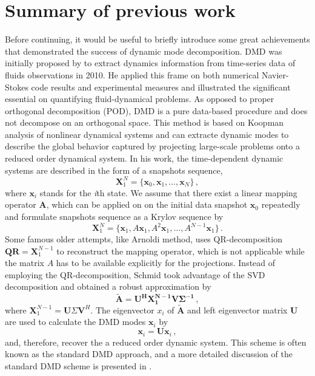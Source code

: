 \section{Summary of previous work}
Before continuing, it would be useful to briefly introduce some great achievements that demonstrated the success of dynamic mode decomposition.
DMD was initially proposed by \citet{schmid_dynamic_2010}\cite{schmid_applications_2011} to extract dynamics information from time-series data of fluids observations in 2010.
He applied this frame on both numerical Navier-Stokes code results and experimental measures and illustrated the significant essential on quantifying fluid-dynamical problems.
As opposed to proper orthogonal decomposition (POD)\cite{lumley2007stochastic}, DMD is a pure data-based procedure and does not decompose on an orthogonal space. 
This method is based on Koopman analysis of nonlinear dynamical systems and can extracte dynamic modes to describe the global behavior captured by projecting large-scale problems onto a reduced order dynamical system.
In his work, the time-dependent dynamic systems are described in the form of a snapshots sequence,
\begin{equation}
 \mathbf{X}^{N}_1 = \{\mathbf{x}_0, \mathbf{x}_1, \ldots, \mathbf{x}_{N} \} \, ,
 \label{eq:snap_matrix}
\end{equation}
where $\mathbf{x}_i$ stands for the {\it i}th state.
We assume that there exist a linear mapping operator $\mathbf{A}$, which can be applied on on the initial data snapshot $\mathbf{x}_0$ repeatedly and formulate snapshots sequence  as a Krylov sequence by
\begin{equation}
 \mathbf{X}^{N}_1 = \{\mathbf{x}_1,A\mathbf{x}_1,A^2\mathbf{x}_1,…,A^{N-1}\mathbf{x}_1 \} \, .
 \label{eq:Krylov_seq}
\end{equation}
Some famous older attempts, like Arnoldi method\cite{arnoldi1951principle}, uses QR-decomposition $\mathbf{QR} = \mathbf{X}^{N-1}_1$ to reconstruct the mapping operator, which is not applicable while the matrix $A$ has to be available explicitly for the projections.\cite{Greenbaum_1997}  \cite{trefethen1997numerical}
Instead of employing the QR-decomposition, Schmid took advantage of the SVD decomposition and obtained a robust approximation by 
\begin{equation}
\mathbf{\tilde{A}} = \mathbf{U^H X_1^{N-1}V\Sigma^{-1}} \, ,
 \label{eq:stanard_DMD}
\end{equation}
where $\mathbf{X}_1^{N-1} = \mathbf{U}\Sigma \mathbf{V}^H$. 
The eigenvector $x_i$ of $\mathbf{\tilde{A}}$ and left eigenvector matrix $\mathbf{U}$ are used to calculate the DMD modes $\mathbf{\mathbf{x}}_i$ by 
\begin{equation}
\mathbf{\mathbf{x}}_i = \mathbf{U} \mathbf{x}_i \, ,
 \label{eq:dyanmic_modes}
\end{equation}
and, therefore, recover the a reduced order dynamic system.
This scheme is often known as the standard DMD approach, and a more detailed discussion of the standard DMD scheme is presented in .   

